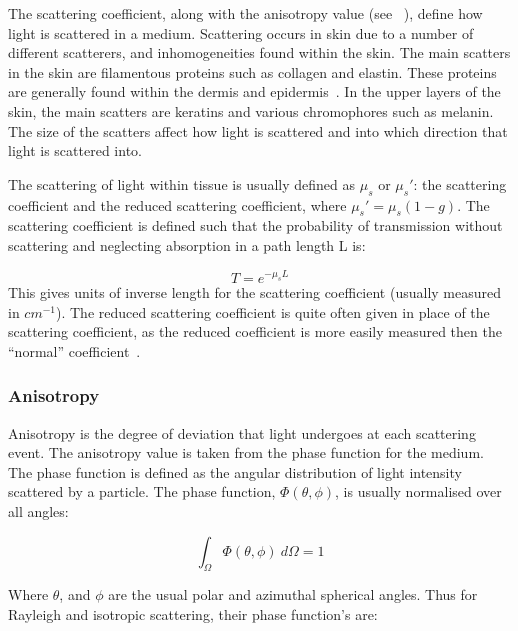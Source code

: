 The scattering coefficient, along with the anisotropy value (see ~), define how light is scattered in a medium. Scattering occurs in skin due to a number of different scatterers, and inhomogeneities found within the skin. The main scatters in the skin are filamentous proteins such as collagen and elastin. These proteins are generally found within the dermis and epidermis~\cite{jacques1996origins}. In the upper layers of the skin, the main scatters are keratins and various chromophores such as melanin. 
The size of the scatters affect how light is scattered and into which direction that light is scattered into.

\medskip

The scattering of light within tissue is usually defined as $\mu_s$ or $\mu_s'$: the scattering coefficient and the reduced scattering coefficient, where $\mu_s'=\mu_s(1-g)$. The scattering coefficient is defined such that the probability of transmission without scattering and neglecting absorption in a path length L is:

\begin{equation}
	T=e^{-\mu_sL}
\end{equation}
This gives units of inverse length for the scattering coefficient (usually measured in $cm^{-1}$). The reduced scattering coefficient is quite often given in place of the scattering coefficient, as the reduced coefficient is more easily measured then the ``normal'' coefficient~\cite{jacques2013optical}.



\subsubsection*{Anisotropy}\label{sec:ansio}

Anisotropy is the degree of deviation that light undergoes at each scattering event. The anisotropy value is taken from the phase function for the medium. The phase function is defined as the angular distribution of light intensity scattered by a particle. The phase function, $\Phi(\theta,\phi)$, is usually normalised over all angles:

\begin{equation}
	\int_{\Omega}\Phi(\theta,\phi)\ d\Omega = 1
\end{equation}

Where $\theta$, and $\phi$ are the usual polar and azimuthal spherical angles.
Thus for Rayleigh and isotropic scattering, their phase function's are:

